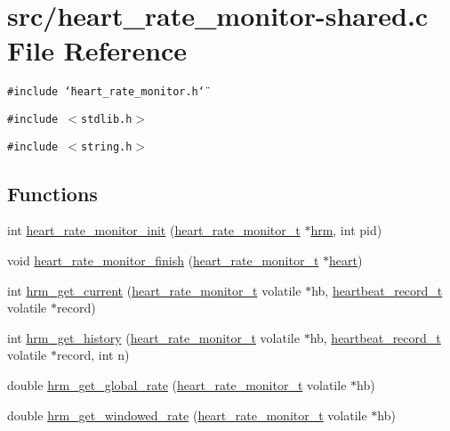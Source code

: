 \hypertarget{heart__rate__monitor-shared_8c}{
\section{src/heart\_\-rate\_\-monitor-shared.c File Reference}
\label{heart__rate__monitor-shared_8c}
}
{\tt \#include \char`\"{}heart\_\-rate\_\-monitor.h\char`\"{}}\par
{\tt \#include $<$stdlib.h$>$}\par
{\tt \#include $<$string.h$>$}\par
\subsection*{Functions}
\begin{CompactItemize}
\item 
int \hyperlink{heart__rate__monitor-shared_8c_d49db9e81266e365b06d5c818d7e5b63}{heart\_\-rate\_\-monitor\_\-init} (\hyperlink{structheart__rate__monitor__t}{heart\_\-rate\_\-monitor\_\-t} $\ast$\hyperlink{lat_8c_f6999b2aa30c479bbb16f354ff38c1e5}{hrm}, int pid)
\item 
void \hyperlink{heart__rate__monitor-shared_8c_070d042cdc3717897098cc6ac9682427}{heart\_\-rate\_\-monitor\_\-finish} (\hyperlink{structheart__rate__monitor__t}{heart\_\-rate\_\-monitor\_\-t} $\ast$\hyperlink{tp_8c_6f3bbe24b9b561560ce8bf9208aeb8a7}{heart})
\item 
int \hyperlink{heart__rate__monitor-shared_8c_333f4dfca799e511a797559107dea290}{hrm\_\-get\_\-current} (\hyperlink{structheart__rate__monitor__t}{heart\_\-rate\_\-monitor\_\-t} volatile $\ast$hb, \hyperlink{structheartbeat__record__t}{heartbeat\_\-record\_\-t} volatile $\ast$record)
\item 
int \hyperlink{heart__rate__monitor-shared_8c_9e7614bee97e7db3cb4e7e4b78c94337}{hrm\_\-get\_\-history} (\hyperlink{structheart__rate__monitor__t}{heart\_\-rate\_\-monitor\_\-t} volatile $\ast$hb, \hyperlink{structheartbeat__record__t}{heartbeat\_\-record\_\-t} volatile $\ast$record, int n)
\item 
double \hyperlink{heart__rate__monitor-shared_8c_ddc73b92ee482b42aa7a91ea5fc3672c}{hrm\_\-get\_\-global\_\-rate} (\hyperlink{structheart__rate__monitor__t}{heart\_\-rate\_\-monitor\_\-t} volatile $\ast$hb)
\item 
double \hyperlink{heart__rate__monitor-shared_8c_4fb2684671956dfa63ea54ce58ac8748}{hrm\_\-get\_\-windowed\_\-rate} (\hyperlink{structheart__rate__monitor__t}{heart\_\-rate\_\-monitor\_\-t} volatile $\ast$hb)

\end{CompactItemize}
